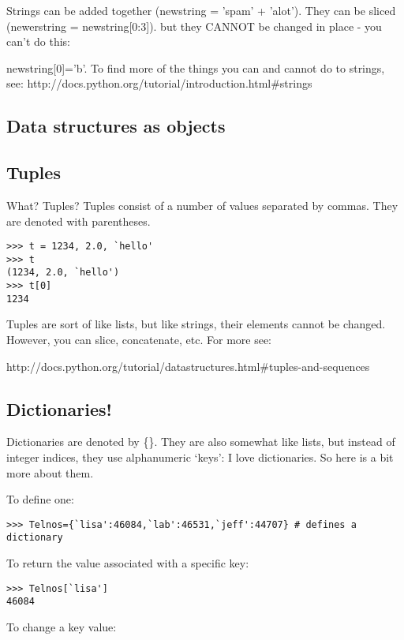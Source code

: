Strings can be added together ({\color{blue}newstring = 'spam' + 'alot'}).  They  can be sliced ({\color{blue}newerstring = newstring[0:3]}). 
but they CANNOT be changed in place - you can't do this: {{\color{blue}newstring[0]='b'}.
To find more of the things you can and cannot do to strings, see: http://docs.python.org/tutorial/introduction.html\#strings

\subsection{Data structures as objects}



\subsection{Tuples}
What?  Tuples?  
Tuples consist of a number of values separated by commas.  They are denoted with parentheses. 
{\singlespacing \color{blue} \begin{verbatim}
>>> t = 1234, 2.0, `hello'
>>> t
(1234, 2.0, `hello')
>>> t[0]
1234
\end{verbatim}}

\noindent Tuples are sort of like lists, but like strings, their elements cannot be changed.  However, you can slice, concatenate, etc.
 For more see: 
 
 http://docs.python.org/tutorial/datastructures.html\#tuples-and-sequences




\subsection {Dictionaries!}

Dictionaries are denoted by \{\}.  They are also somewhat like lists, but instead of integer indices, they use alphanumeric `keys':
I love dictionaries.  So here is a bit more about them.

\noindent
To define one: 
{\singlespacing \color{blue} \begin{verbatim}
>>> Telnos={`lisa':46084,`lab':46531,`jeff':44707} # defines a dictionary
\end{verbatim}}

\noindent
To return the value associated with a specific key:
{\singlespacing \color{blue} \begin{verbatim}
>>> Telnos[`lisa']
46084
\end{verbatim}}

\noindent
 To change a key value:

}
